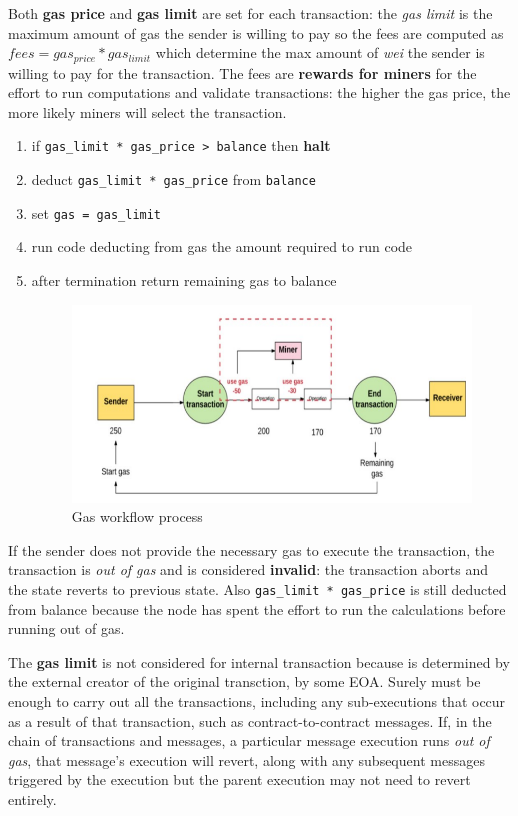 \documentclass[10pt,a4paper]{report}
\begin{document}
Both \textbf{gas price} and \textbf{gas limit} are set for each transaction: the \textit{gas limit} is the maximum amount of gas the sender is willing to pay so the fees are computed as $fees = gas_{price}*gas_{limit}$ which determine the max amount of \textit{wei} the sender is willing to pay for the transaction.
The fees are \textbf{rewards for miners} for the effort to run computations and validate transactions: the higher the gas price, the more likely miners will select the transaction.
\begin{enumerate}
	\item 
	if \texttt{gas\_limit * gas\_price > balance} then \textbf{halt}
	\item 
	deduct \texttt{gas\_limit * gas\_price} from \texttt{balance}
	\item 
	set \texttt{gas = gas\_limit}
	\item 
	run code deducting from gas the amount required to run code
	\item 
	after termination return remaining gas to balance
	\begin{figure}[h]
		\centering
		\includegraphics[scale=0.50]{images/Pasted image 20230417124601.png}		\caption{Gas workflow process}
	\end{figure}
	
\end{enumerate}

If the sender does not provide the necessary gas to execute the transaction, the transaction is \textit{out of gas} and is considered \textbf{invalid}: the transaction aborts and the state reverts to previous state. Also \texttt{gas\_limit * gas\_price} is still deducted from balance because the node has spent the effort to run the calculations before running out of gas.

The \textbf{gas limit} is not considered for internal transaction because is determined by the external creator of the original transction, by some EOA. Surely must be enough to carry out all the transactions, including any sub-executions that occur as a result of that transaction, such as contract-to-contract messages.
If, in the chain of transactions and messages, a particular message execution runs \textit{out of gas}, that message’s execution will revert, along with any subsequent messages triggered by the execution but the parent execution may not need to revert entirely.
\end{document}
